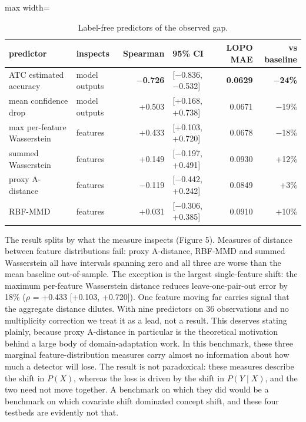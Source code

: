 \documentclass[preprint,12pt]{elsarticle}
\begin{document}
\begin{table}[htbp]\centering\scriptsize
\caption{Label-free predictors of the observed gap.}
\begin{adjustbox}{max width=\textwidth}\begin{tabular}{llrlrr}
\toprule
predictor & inspects & Spearman & 95\% CI & LOPO MAE & vs baseline \\
\midrule
ATC estimated accuracy & model outputs & \textbf{$-$0.726} & [$-$0.836, $-$0.532] & \textbf{0.0629} & \textbf{$-$24\%} \\
mean confidence drop & model outputs & +0.503 & [+0.168, +0.738] & 0.0671 & $-$19\% \\
max per-feature Wasserstein & features & +0.433 & [+0.103, +0.720] & 0.0678 & $-$18\% \\
summed Wasserstein & features & +0.149 & [$-$0.197, +0.491] & 0.0930 & +12\% \\
proxy A-distance & features & $-$0.119 & [$-$0.442, +0.242] & 0.0849 & +3\% \\
RBF-MMD & features & +0.031 & [$-$0.306, +0.385] & 0.0910 & +10\% \\
\bottomrule
\end{tabular}\end{adjustbox}
\end{table}

The result splits by what the measure inspects (Figure 5). Measures of distance between feature distributions fail: proxy A-distance, RBF-MMD and summed Wasserstein all have intervals spanning zero and all three are worse than the mean baseline out-of-sample. The exception is the largest single-feature shift: the maximum per-feature Wasserstein distance reduces leave-one-pair-out error by 18\% ($\rho$ = +0.433 [+0.103, +0.720]). One feature moving far carries signal that the aggregate distance dilutes. With nine predictors on 36 observations and no multiplicity correction we treat it as a lead, not a result. This deserves stating plainly, because proxy A-distance in particular is the theoretical motivation behind a large body of domain-adaptation work. In this benchmark, these three marginal feature-distribution measures carry almost no information about how much a detector will lose. The result is not paradoxical: these measures describe the shift in $P(X)$, whereas the loss is driven by the shift in $P(Y \mid X)$, and the two need not move together. A benchmark on which they did would be a benchmark on which covariate shift dominated concept shift, and these four testbeds are evidently not that.
\end{document}
